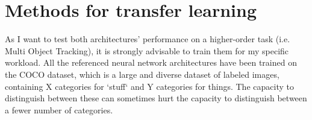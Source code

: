 \chapter{Methods for transfer learning}

As I want to test both architectures' performance on a higher-order task (i.e. Multi Object Tracking), it is strongly advisable to train them for my specific workload. All the referenced neural network architectures have been trained on the COCO dataset, which is a large and diverse dataset of labeled images, containing X categories for `stuff` and Y categories for things. The capacity to distinguish between these can sometimes hurt the capacity to distinguish between a fewer number of categories. 

